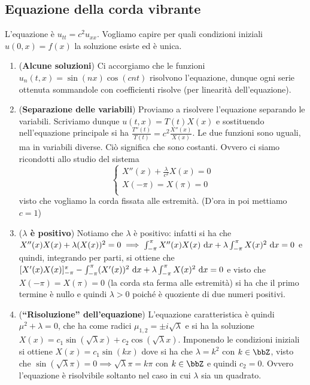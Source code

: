 \documentclass[a4paper,NoNotes,GeneralMath]{stdmdoc}
\newcommand{\intpie}{\int_{-\pi}^\pi }
\begin{document}
        \subsection*{Equazione della corda vibrante}
        L'equazione è $u_{tt} = c^2 u_{xx}$. Vogliamo capire per quali condizioni iniziali $u(0, x) = f(x)$ la soluzione esiste ed è unica.
        \begin{enumerate}
        \item ({\bf Alcune soluzioni}) Ci accorgiamo che le funzioni $u_n(t, x) = \sin(nx) \cos(cnt)$ risolvono l'equazione, dunque ogni serie ottenuta sommandole con coefficienti risolve (per linearità dell'equazione).
        \item ({\bf Separazione delle variabili}) Proviamo a risolvere l'equazione separando le variabili. Scriviamo dunque $u(t, x) = T(t) X(x)$ e sostituendo nell'equazione principale si ha $\frac{T''(t)}{T(t)} = c^2 \frac{X''(x)}{X(x)}$. Le due funzioni sono uguali, ma in variabili diverse. Ciò significa che sono costanti. Ovvero ci siamo ricondotti allo studio del sistema $$\left\{ \begin{array}{c} X''(x) + \frac{\lambda}{c^2} X(x) = 0 \\ X(-\pi) = X(\pi) = 0 \\ \end{array} \right.$$ visto che vogliamo la corda fissata alle estremità. (D'ora in poi mettiamo $c = 1$)
        \item ({\bf $\lambda$ è positivo}) Notiamo che $\lambda$ è positivo: infatti si ha che $X''(x) X(x) + \lambda (X(x))^2 = 0 \implies \intpie X''(x)X(x) \de x + \lambda \intpie X(x)^2 \de x = 0$ e quindi, integrando per parti, si ottiene che $[X'(x)X(x)]_{-\pi}^{\pi} - \intpie (X'(x))^2 \de x + \lambda \intpie X(x)^2 \de x = 0$ e visto che $X(-\pi) = X(\pi) = 0$ (la corda sta ferma alle estremità) si ha che il primo termine è nullo e quindi $\lambda > 0$ poiché è quoziente di due numeri positivi.
        \item ({\bf ``Risoluzione'' dell'equazione}) L'equazione caratteristica è quindi $\mu^2 + \lambda = 0$, che ha come radici $\mu_{1,2} = \pm i \sqrt{\lambda}$ e si ha la soluzione $X(x) = c_1 \sin(\sqrt\lambda x) + c_2 \cos(\sqrt\lambda x)$. Imponendo le condizioni iniziali si ottiene $X(x) = c_1 \sin(kx)$ dove si ha che $\lambda = k^2$ con $k \in \bbZ$, visto che $\sin(\sqrt\lambda \pi) = 0 \implies \sqrt\lambda \pi = k \pi$ con $k \in \bbZ$ e quindi $c_2 = 0$. Ovvero l'equazione è risolvibile soltanto nel caso in cui $\lambda$ sia un quadrato.

\end{enumerate}
\end{document}
